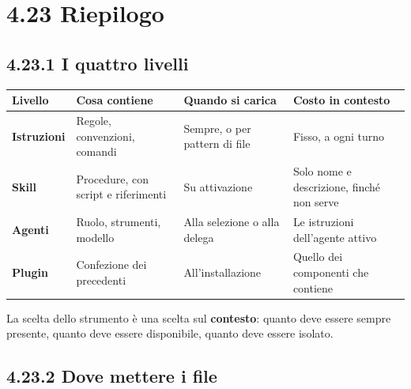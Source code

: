 \documentclass[
  italian,
  10pt,
]{book}
\newcounter{none} %
\begin{document}
\section{4.23 Riepilogo}\label{riepilogo}

\subsection{4.23.1 I quattro livelli}\label{i-quattro-livelli}

{\def\LTcaptype{none} %
\begin{longtable}[]{@{}
  >{\raggedright\arraybackslash}p{}
  >{\raggedright\arraybackslash}p{}
  >{\raggedright\arraybackslash}p{}
  >{\raggedright\arraybackslash}p{}@{}}
\toprule\noalign{}
\begin{minipage}[b]{\linewidth}\raggedright
Livello
\end{minipage} & \begin{minipage}[b]{\linewidth}\raggedright
Cosa contiene
\end{minipage} & \begin{minipage}[b]{\linewidth}\raggedright
Quando si carica
\end{minipage} & \begin{minipage}[b]{\linewidth}\raggedright
Costo in contesto
\end{minipage} \\
\midrule\noalign{}
\endhead
\bottomrule\noalign{}
\endlastfoot
\textbf{Istruzioni} & Regole, convenzioni, comandi & Sempre, o per
pattern di file & Fisso, a ogni turno \\
\textbf{Skill} & Procedure, con script e riferimenti & Su attivazione &
Solo nome e descrizione, finché non serve \\
\textbf{Agenti} & Ruolo, strumenti, modello & Alla selezione o alla
delega & Le istruzioni dell'agente attivo \\
\textbf{Plugin} & Confezione dei precedenti & All'installazione & Quello
dei componenti che contiene \\
\end{longtable}
}

La scelta dello strumento è una scelta sul \textbf{contesto}: quanto
deve essere sempre presente, quanto deve essere disponibile, quanto deve
essere isolato.

\subsection{4.23.2 Dove mettere i file}\label{dove-mettere-i-file}
\end{document}
